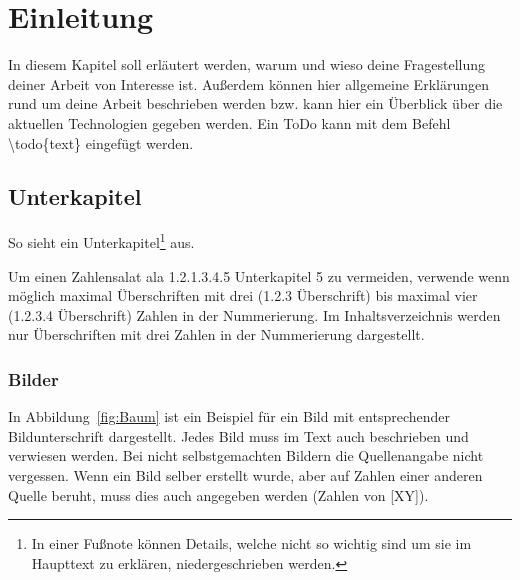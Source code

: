 %
%
%
%

\section{Einleitung}

In diesem Kapitel soll erläutert werden, warum und wieso deine Fragestellung deiner Arbeit von Interesse ist. Außerdem können hier allgemeine Erklärungen rund um deine Arbeit beschrieben werden bzw. kann hier ein Überblick über die aktuellen Technologien gegeben werden. Ein ToDo kann mit dem Befehl \textbackslash todo\{text\} eingefügt werden.


\subsection{Unterkapitel}

So sieht ein Unterkapitel\footnote{In einer Fußnote können Details, welche nicht so wichtig sind um sie im Haupttext zu erklären, niedergeschrieben werden.} aus.

Um einen Zahlensalat ala {\glqq}1.2.1.3.4.5 Unterkapitel 5{\grqq} zu vermeiden, verwende wenn möglich maximal Überschriften mit drei (1.2.3 Überschrift) bis maximal vier (1.2.3.4 Überschrift) Zahlen in der Nummerierung. Im Inhaltsverzeichnis werden nur Überschriften mit drei Zahlen in der Nummerierung dargestellt.


\subsubsection{Bilder}

In Abbildung~\ref{fig:Baum} ist ein Beispiel für ein Bild mit entsprechender Bildunterschrift dargestellt. Jedes Bild muss im Text auch beschrieben und verwiesen werden. Bei nicht selbstgemachten Bildern die Quellenangabe nicht vergessen. Wenn ein Bild selber erstellt wurde, aber auf Zahlen einer anderen Quelle beruht, muss dies auch angegeben werden (Zahlen von [XY]).

